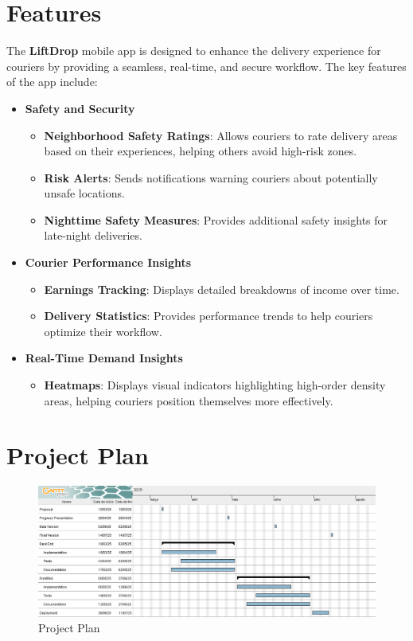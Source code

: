 \documentclass[a4paper,twoside,11pt]{article}
\begin{document}
{\section*{Features}

The \textbf{LiftDrop} mobile app is designed to enhance the delivery experience for couriers by providing a seamless, real-time, and secure workflow. The key features of the app include:

\begin{itemize}
    \item \textbf{Safety and Security}
    \begin{itemize}
        \item \textbf{Neighborhood Safety Ratings}: Allows couriers to rate delivery areas based on their experiences, helping others avoid high-risk zones.
        \item \textbf{Risk Alerts}: Sends notifications warning couriers about potentially unsafe locations.
        \item \textbf{Nighttime Safety Measures}: Provides additional safety insights for late-night deliveries.
    \end{itemize}

    \item \textbf{Courier Performance Insights}
    \begin{itemize}
        \item \textbf{Earnings Tracking}: Displays detailed breakdowns of income over time.
        \item \textbf{Delivery Statistics}: Provides performance trends to help couriers optimize their workflow.
    \end{itemize}

    \item \textbf{Real-Time Demand Insights}
    \begin{itemize}
        \item \textbf{Heatmaps}: Displays visual indicators highlighting high-order density areas, helping couriers position themselves more effectively.
    \end{itemize}
\end{itemize}

}

\section*{Project Plan}

\begin{figure}[h]
    \centering
    \includegraphics[width=\textwidth]{ProjectPlan.png}
    \caption{Project Plan}
    \label{fig:project-plan}
\end{figure}



\end{document}
